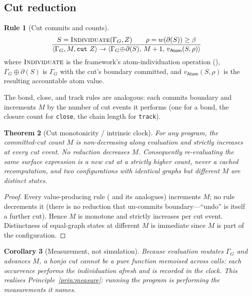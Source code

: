 \documentclass[11pt,a4paper]{article}
\theoremstyle{thmstyle}
\newtheorem{theorem}{Theorem}[section]
\newtheorem{corollary}[theorem]{Corollary}
\theoremstyle{definition}
\newtheorem{rulename}[theorem]{Rule}
\theoremstyle{remark}
\newcommand{\flo}{\beta}
\newcommand{\res}{\rho}
\newcommand{\cut}{\partial}
\newcommand{\hj}[1]{\texttt{#1}}
\begin{document}
\subsection{Cut reduction}

\begin{rulename}[Cut commits and counts]
\label{rule:cut-step}
\[
\frac{S=\textsc{Individuate}(\Gamma_G,Z)\qquad
      \res=w(\cut(S))\ge\flo}
     {\langle\Gamma_G,M,\hj{cut}\ Z\rangle \to
      \langle\Gamma_G\!\oplus\!\cut(S),\,M+1,\,
      v_{\mathsf{Atom}}(S,\res)\rangle}
\]
where $\textsc{Individuate}$ is the framework's atom-individuation
operation (), $\Gamma_G\!\oplus\!\cut(S)$ is
$\Gamma_G$ with the cut's boundary committed, and $v_{\mathsf{Atom}}(S,\res)$
is the resulting accountable atom value.
\end{rulename}

The bond, close, and track rules are analogous: each commits boundary and
increments $M$ by the number of cut events it performs (one for a bond,
the closure count for \hj{close}, the chain length for \hj{track}).

\begin{theorem}[Cut monotonicity / intrinsic clock]
\label{thm:monotone}
For any program, the committed-cut count $M$ is non-decreasing along
evaluation and strictly increases at every cut event. No reduction
decreases $M$. Consequently re-evaluating the same surface expression is a
new cut at a strictly higher count, never a cached recomputation, and two
configurations with identical graphs but different $M$ are distinct
states.
\end{theorem}

\begin{proof}
Every value-producing rule ( and its analogues)
increments $M$; no rule decrements it (there is no reduction that
un-commits boundary---``undo'' is itself a further cut). Hence $M$ is
monotone and strictly increases per cut event. Distinctness of equal-graph
states at different $M$ is immediate since $M$ is part of the
configuration.
\end{proof}

\begin{corollary}[Measurement, not simulation]
\label{cor:measure}
Because evaluation mutates $\Gamma_G$ and advances $M$, a honjo cut cannot
be a pure function memoised across calls: each occurrence performs the
individuation afresh and is recorded in the clock. This realises
Principle~\ref{prin:measure}: running the program \emph{is} performing the
measurements it names.
\end{corollary}
\end{document}

